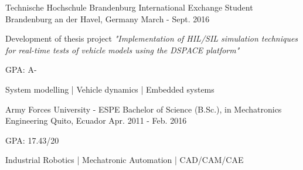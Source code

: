 
\begin{cventries}


  \cventry
    {Technische Hochschule Brandenburg}
    {International Exchange Student}
    {Brandenburg an der Havel, Germany}
    {March - Sept. 2016}
    {
      \begin{cvitems}
        \item {Development of thesis project \textit{"Implementation of HIL/SIL simulation techniques for real-time tests of vehicle models using the DSPACE platform"}}
        \item {GPA: A-}
        \item {System modelling  |  Vehicle dynamics  |  Embedded systems}
      \end{cvitems}
    }

  \cventry
    {Army Forces University - ESPE}
    {Bachelor of Science (B.Sc.), in Mechatronics Engineering}
    {Quito, Ecuador}
    {Apr. 2011 - Feb. 2016}
    {
      \begin{cvitems}
        \item {GPA: 17.43/20}
        \item {Industrial Robotics  |  Mechatronic Automation  |  CAD/CAM/CAE}
      \end{cvitems}
    }
    
    
\end{cventries}
